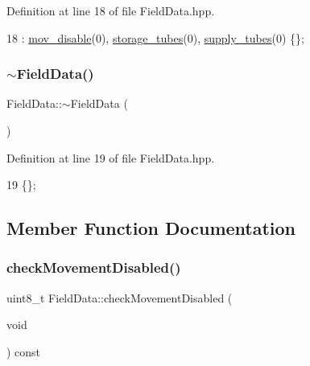 Definition at line 18 of file Field\+Data.\+hpp.


\begin{DoxyCode}
18 : \hyperlink{class_field_data_a82ed3c6771df262aae42cb332ccc7d0c}{mov\_disable}(0), \hyperlink{class_field_data_a215428022f049a8f0b6702783291b636}{storage\_tubes}(0), \hyperlink{class_field_data_a2ac91dcec791870370d578c276993690}{supply\_tubes}(0) \{\};
\end{DoxyCode}
\mbox{\label{class_field_data_a1dc5aaecde15432e78ec3c6fbd640c24}} 
\subsubsection{\texorpdfstring{$\sim$\+Field\+Data()}{~FieldData()}}
{\footnotesize\ttfamily Field\+Data\+::$\sim$\+Field\+Data (\begin{DoxyParamCaption}{ }\end{DoxyParamCaption})\hspace{0.3cm}{\ttfamily [inline]}}



Definition at line 19 of file Field\+Data.\+hpp.


\begin{DoxyCode}
19 \{\};
\end{DoxyCode}


\subsection{Member Function Documentation}
\mbox{\label{class_field_data_ab43f0866e57dbdb05d56550a6ab1e8e0}} 
\subsubsection{\texorpdfstring{check\+Movement\+Disabled()}{checkMovementDisabled()}}
{\footnotesize\ttfamily uint8\+\_\+t Field\+Data\+::check\+Movement\+Disabled (\begin{DoxyParamCaption}\item[{void}]{ }\end{DoxyParamCaption}) const}



